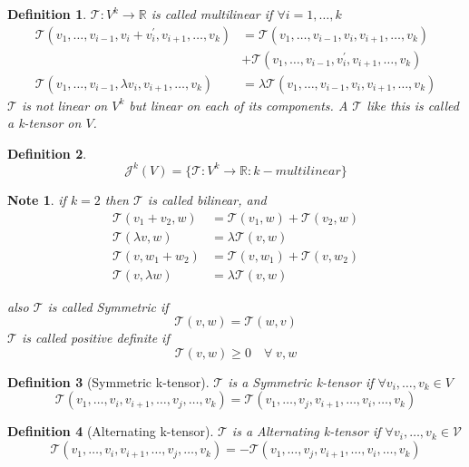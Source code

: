 \documentclass[11pt]{article}
\def\RR{\mathbb{R}}
\newtheorem{definition}{Definition}[section]
\newtheorem*{note}{Note}
\begin{document}
\begin{definition}
$\mathcal{T}:V^k \rightarrow \RR$ is called multilinear if  $\forall i = 1, \dots , k$
\begin{align*}
\mathcal{T}(v_1, \dots , v_{i-1},v_i +v_i^{'}, v_{i+1}, \dots , v_k) &= \mathcal{T}(v_1, \dots , v_{i-1},v_i , v_{i+1}, \dots , v_k)\\ &+ \mathcal{T}(v_1, \dots , v_{i-1},v_i^{'}, v_{i+1}, \dots , v_k)\\
\mathcal{T}(v_1, \dots , v_{i-1},\lambda v_i , v_{i+1}, \dots , v_k) &= \lambda\mathcal{T}(v_1, \dots , v_{i-1},v_i , v_{i+1}, \dots , v_k)\end{align*}
$\mathcal{T}$ is not linear on $V^k$ but linear on each of its components. A $\mathcal{T}$ like this is called a k-tensor on $V$.
\end{definition}

\begin{definition}
\[\mathcal{J}^k(V) = \{\mathcal{T}:V^k \rightarrow \RR : k-multilinear\}\]
\end{definition}

\begin{note} if $k=2$ then $\mathcal{T}$ is called bilinear, and
\begin{align*}
\mathcal{T}(v_1 + v_2 , w) &= \mathcal{T}(v_1, w)+ \mathcal{T}(v_2, w)\\
\mathcal{T}(\lambda v, w) & = \lambda\mathcal{T}(v, w)\\
\mathcal{T}(v,w_1 + w_2) &= \mathcal{T}(v, w_1)+ \mathcal{T}(v, w_2)\\
\mathcal{T}(v, \lambda w) & = \lambda\mathcal{T}(v, w)
\end{align*}

also
$\mathcal{T}$ is called Symmetric if \[\mathcal{T}(v,w) =  \mathcal{T}(w,v)\]
$\mathcal{T}$ is called positive definite if \[\mathcal{T}(v,w)\geq 0 \quad \forall \; v,w\]
 \end{note}

\begin{definition}[Symmetric k-tensor]
$\mathcal{T}$ is a Symmetric k-tensor if $\forall v_i , \dots , v_k \in V$
\[\mathcal{T}(v_1, \dots , v_{i},v_{i+1} , \dots, v_{j}, \dots , v_k) = \mathcal{T}(v_1, \dots , v_{j},v_{i+1} , \dots, v_{i}, \dots , v_k)\]
\end{definition}

\begin{definition}[Alternating k-tensor]$\mathcal{T}$ is a Alternating k-tensor if $\forall v_i , \dots , v_k \in \mathcal{V}$
\[\mathcal{T}(v_1, \dots , v_{i},v_{i+1} , \dots, v_{j}, \dots , v_k) = -\mathcal{T}(v_1, \dots , v_{j},v_{i+1} , \dots, v_{i}, \dots , v_k)\]
\end{definition}
\end{document}
